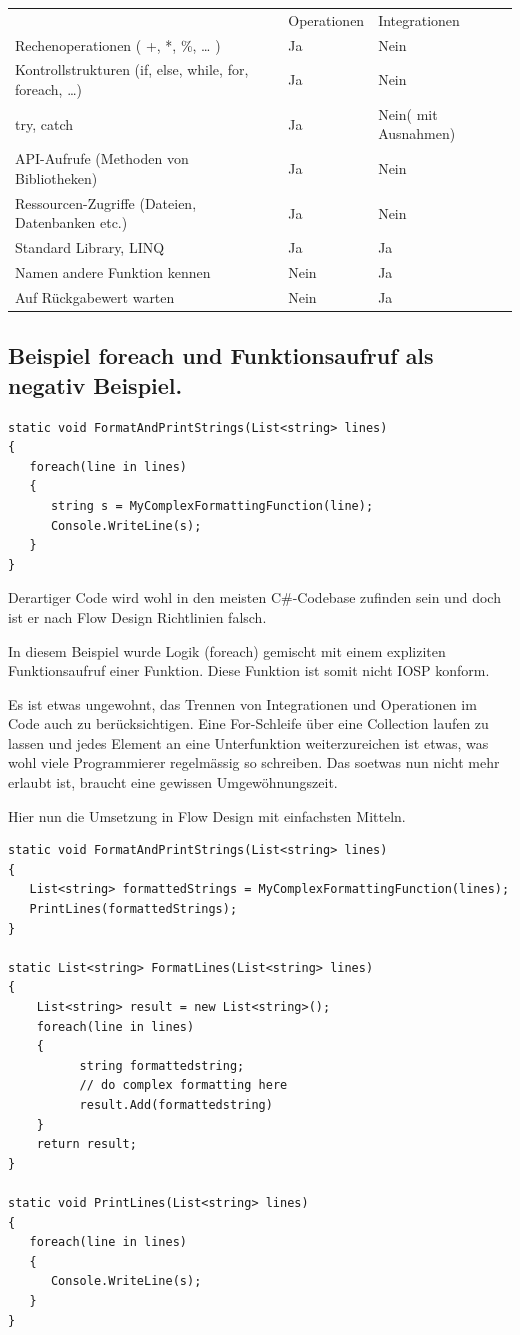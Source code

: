 \documentclass[11pt]{article}
\begin{document}
\begin{enumerate}
\begin{center}
\begin{tabular}{lll}
 & Operationen & Integrationen\\
Rechenoperationen ( +, *, \%, \ldots{} ) & Ja & Nein\\
Kontrollstrukturen (if, else, while, for, foreach, \ldots{}) & Ja & Nein\\
try, catch & Ja & Nein( mit Ausnahmen)\\
API-Aufrufe (Methoden von Bibliotheken) & Ja & Nein\\
Ressourcen-Zugriffe (Dateien, Datenbanken etc.) & Ja & Nein\\
Standard Library, LINQ & Ja & Ja\\
Namen andere Funktion kennen & Nein & Ja\\
Auf Rückgabewert warten & Nein & Ja\\
\end{tabular}
\end{center}
\end{enumerate}

\subsection{Beispiel foreach und Funktionsaufruf als negativ Beispiel.}
\label{sec:orgheadline26}
\begin{verbatim}
static void FormatAndPrintStrings(List<string> lines)
{
   foreach(line in lines)
   {
      string s = MyComplexFormattingFunction(line);
      Console.WriteLine(s);
   }
}
\end{verbatim}
Derartiger Code wird wohl in den meisten C\#-Codebase zufinden sein und doch ist er nach Flow Design Richtlinien falsch.

In diesem Beispiel wurde Logik (foreach) gemischt mit einem expliziten Funktionsaufruf einer Funktion.
Diese Funktion ist somit nicht IOSP konform.

Es ist etwas ungewohnt, das Trennen von Integrationen und Operationen im Code auch zu berücksichtigen.
Eine For-Schleife über eine Collection laufen zu lassen und jedes Element an eine Unterfunktion weiterzureichen ist etwas,
was wohl viele Programmierer regelmässig so schreiben.
Das soetwas nun nicht mehr erlaubt ist, braucht eine gewissen Umgewöhnungszeit.


Hier nun die Umsetzung in Flow Design mit einfachsten Mitteln.



\begin{verbatim}
static void FormatAndPrintStrings(List<string> lines)
{
   List<string> formattedStrings = MyComplexFormattingFunction(lines);
   PrintLines(formattedStrings);
}

static List<string> FormatLines(List<string> lines)
{
    List<string> result = new List<string>();
    foreach(line in lines)
    {
          string formattedstring;
          // do complex formatting here
          result.Add(formattedstring) 
    }
    return result;
}

static void PrintLines(List<string> lines)
{
   foreach(line in lines)
   {
      Console.WriteLine(s);
   }
}
\end{verbatim}
\end{document}

